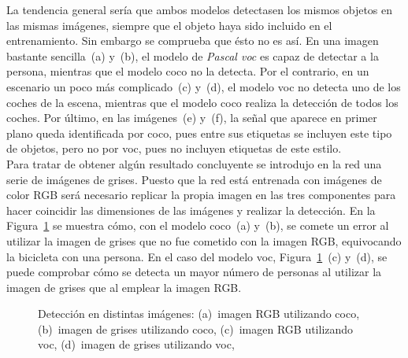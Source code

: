 La tendencia general sería que ambos modelos detectasen los mismos objetos en las mismas imágenes, siempre que el objeto haya sido incluido en el entrenamiento. Sin embargo se comprueba que ésto no es así. En una imagen bastante sencilla~(a) y~(b), el modelo de \textit{Pascal \acrshort{voc}} es capaz de detectar a la persona, mientras que el modelo \acrshort{coco} no la detecta. Por el contrario, en un escenario un poco más complicado~(c) y~(d), el modelo \acrshort{voc} no detecta uno de los coches de la escena, mientras que el modelo \acrshort{coco} realiza la detección de todos los coches. Por último, en las imágenes~(e) y~(f), la señal que aparece en primer plano queda identificada por \acrshort{coco}, pues entre sus etiquetas se incluyen este tipo de objetos, pero no por \acrshort{voc}, pues no incluyen etiquetas de este estilo.\\

Para tratar de obtener algún resultado concluyente se introdujo en la red una serie de imágenes de grises. Puesto que la red está entrenada con imágenes de color RGB será necesario replicar la propia imagen en las tres componentes para hacer coincidir las dimensiones de las imágenes y realizar la detección. En la Figura~\ref{fig.ssd2} se muestra cómo, con el modelo \acrshort{coco}~(a) y~(b), se comete un error al utilizar la imagen de grises que no fue cometido con la imagen RGB, equivocando la bicicleta con una persona. En el caso del modelo \acrshort{voc}, Figura~\ref{fig.ssd2}~(c) y~(d), se puede comprobar cómo se detecta un mayor número de personas al utilizar la imagen de grises que al emplear la imagen RGB.
\begin{figure}[H]
	\centering
	 \hspace{10pt}
	 \hspace{10pt}
	\caption{Detección en distintas imágenes: (a)~imagen RGB utilizando \acrshort{coco}, (b)~imagen de grises utilizando \acrshort{coco}, (c)~imagen RGB utilizando \acrshort{voc}, (d)~imagen de grises utilizando \acrshort{voc},}
	\label{fig.ssd2}
\end{figure}

